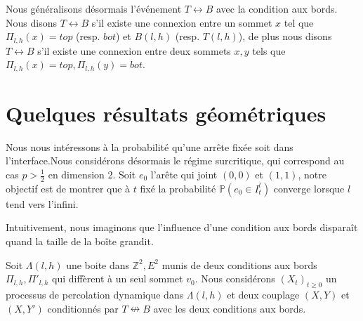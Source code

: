 \documentclass[titlepage,a4paper,12pt]{article}
\newcounter{prop}
\newcounter{cor}
\begin{document}
Nous généralisons désormais l'événement $T\leftrightarrow B$ avec la condition aux bords. Nous disons $T\leftrightarrow B$ s'il existe une connexion entre un sommet $x$ tel que $\Pi_{l,h}(x)= top$ (resp. $bot$) et $B(l,h)$ (resp. $T(l,h)$), de plus nous disons $T\leftrightarrow B$ s'il existe une connexion entre deux sommets $x,y$ tels que $\Pi_{l,h}(x) = top, \Pi_{l,h}(y) = bot$.
\section{Quelques résultats géométriques}
Nous nous intéressons à la probabilité qu'une arrête fixée soit dans l'interface.Nous considérons désormais le régime surcritique, qui correspond au cas $p>\frac{1}{2}$ en dimension 2. Soit $e_0$ l'arête qui joint $(0,0)$ et $(1,1)$, notre objectif est de montrer que à $t$ fixé la probabilité $\mathbb{P}(e_0 \in I^l_t)$ converge lorsque $l$ tend vers l'infini.

Intuitivement, nous imaginons que l'influence d'une condition aux bords disparaît quand la taille de la boîte grandit. %

Soit $\Lambda(l,h)$ une boite dans $\mathbb{Z}^2,E^2$ munis de deux conditions aux bords $\Pi_{l,h}, \Pi'_{l,h}$ qui diffèrent à un seul sommet $v_0$. Nous considérons $(X_t)_{t\geqslant 0}$ un processus de percolation dynamique dans $\Lambda(l,h)$ et deux couplage $(X,Y)$ et $(X,Y')$ conditionnés par $T\nleftrightarrow B$ avec les deux conditions aux bords.
\end{document}
